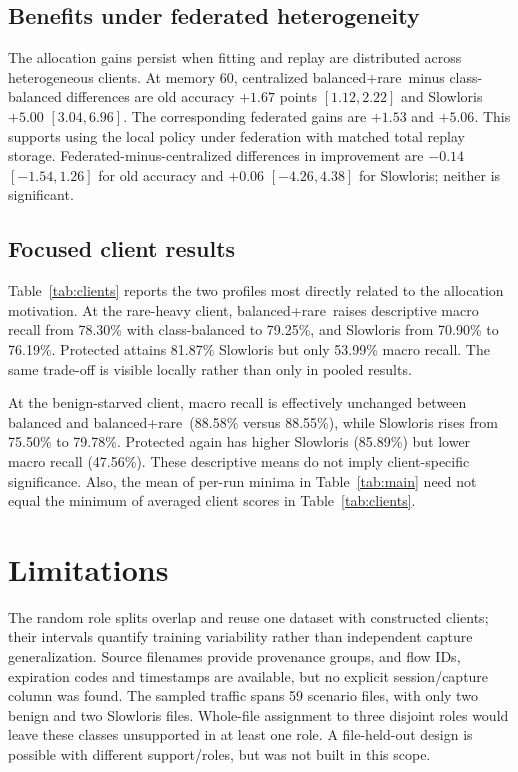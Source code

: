 \documentclass[journal,10pt]{IEEEtran}
\newcommand{\BR}{balanced+rare}
\begin{document}
\subsection{Benefits under federated heterogeneity}
The allocation gains persist when fitting and replay are distributed across heterogeneous clients. At memory 60, centralized \BR\ minus class-balanced differences are old accuracy $+1.67$ points $[1.12,2.22]$ and Slowloris $+5.00$ $[3.04,6.96]$. The corresponding federated gains are $+1.53$ and $+5.06$. This supports using the local policy under federation with matched total replay storage. Federated-minus-centralized differences in improvement are $-0.14$ $[-1.54,1.26]$ for old accuracy and $+0.06$ $[-4.26,4.38]$ for Slowloris; neither is significant.



\subsection{Focused client results}

Table~\ref{tab:clients} reports the two profiles most directly related to the allocation motivation. At the rare-heavy client, \BR\ raises descriptive macro recall from 78.30\% with class-balanced to 79.25\%, and Slowloris from 70.90\% to 76.19\%. Protected attains 81.87\% Slowloris but only 53.99\% macro recall. The same trade-off is visible locally rather than only in pooled results.

At the benign-starved client, macro recall is effectively unchanged between balanced and \BR\ (88.58\% versus 88.55\%), while Slowloris rises from 75.50\% to 79.78\%. Protected again has higher Slowloris (85.89\%) but lower macro recall (47.56\%). These descriptive means do not imply client-specific significance. Also, the mean of per-run minima in Table~\ref{tab:main} need not equal the minimum of averaged client scores in Table~\ref{tab:clients}.

\balance
\section{Limitations}
The random role splits overlap and reuse one dataset with constructed clients; their intervals quantify training variability rather than independent capture generalization. Source filenames provide provenance groups, and flow IDs, expiration codes and timestamps are available, but no explicit session/capture column was found. The sampled traffic spans 59 scenario files, with only two benign and two Slowloris files. Whole-file assignment to three disjoint roles would leave these classes unsupported in at least one role. A file-held-out design is possible with different support/roles, but was not built in this scope.
\end{document}
